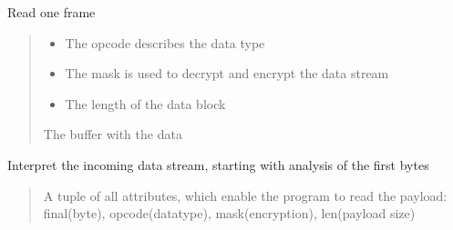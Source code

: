 \documentclass[letterpaper,10pt,english]{sphinxmanual}
\begin{document}
\begin{savenotes}
\begin{fulllineitems}
\begin{savenotes}\begin{fulllineitems}
\label{\detokenize{eezz:eezz.websocket.TWebSocketClient.read_frame}}
\pysigstartsignatures
{}
\pysigstopsignatures
\sphinxAtStartPar
Read one frame
\begin{quote}\begin{description}
\begin{itemize}
\item {} 
\sphinxAtStartPar
{} \textendash{} The opcode describes the data type

\item {} 
\sphinxAtStartPar
{} \textendash{} The mask is used to decrypt and encrypt the data stream

\item {} 
\sphinxAtStartPar
{} \textendash{} The length of the data block

\end{itemize}

\sphinxAtStartPar
The buffer with the data

\end{description}\end{quote}

\end{fulllineitems}\end{savenotes}


\begin{savenotes}\begin{fulllineitems}
\label{\detokenize{eezz:eezz.websocket.TWebSocketClient.read_frame_header}}
\pysigstartsignatures
{}
\pysigstopsignatures
\sphinxAtStartPar
Interpret the incoming data stream, starting with analysis of the first bytes
\begin{quote}\begin{description}
\sphinxAtStartPar
A tuple of all attributes, which enable the program to read the payload:         final(byte), opcode(data\sphinxhyphen{}type), mask(encryption), len(payload size)


\end{description}
\end{quote}
\end{fulllineitems}
\end{savenotes}
\end{fulllineitems}
\end{savenotes}
\end{document}

